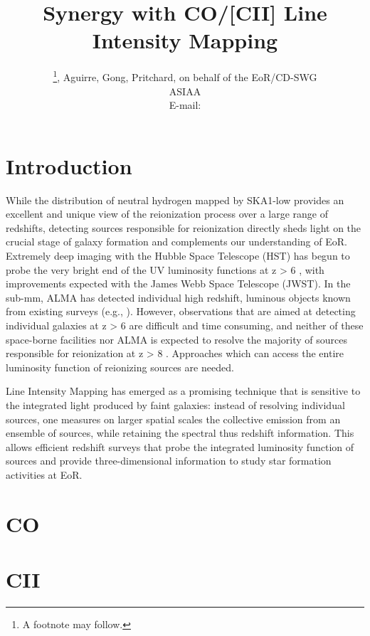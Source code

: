 \documentclass{PoS}
\title{Synergy with CO/[CII] Line Intensity Mapping}
\author{\speaker{Chang}\thanks{A footnote may follow.}, Aguirre, Gong,
  Pritchard,  on behalf of the EoR/CD-SWG\\
        ASIAA\\
        E-mail: \email{tcchang@asiaa.sinica.edu.tw}}
\begin{document}
\section{Introduction}

While the distribution of neutral
hydrogen mapped by SKA1-low provides an excellent and unique view of the reionization
process over a large range of redshifts, detecting sources responsible for
reionization directly sheds light on the crucial stage of galaxy
formation and complements our understanding of EoR.   Extremely deep
imaging with the Hubble Space Telescope (HST) has begun to probe the very bright end of the UV
luminosity functions at z > 6 \cite{2014arXiv1403.4295B, 2013ApJ...768...71R}, with improvements expected 
with the  James Webb Space Telescope (JWST). In the sub-mm, ALMA has
detected individual high redshift, luminous objects known from
existing surveys (e.g., \cite{2013ApJ...778..102O}). However, observations that are aimed at
detecting individual galaxies at z > 6 are difficult and time
consuming, and neither of these space-borne facilities nor ALMA is
expected to resolve the majority of sources responsible for
reionization at z > 8 \cite{2011MNRAS.414..847S}.  Approaches which can access the entire
luminosity function of reionizing sources are needed.

Line Intensity Mapping has emerged as a promising technique that is sensitive
to the integrated light produced by faint galaxies: instead of
resolving individual sources, one measures on larger spatial scales the collective emission
from an ensemble of sources, while retaining the spectral thus redshift
information.  This allows efficient redshift surveys that probe the
integrated luminosity function of sources and provide three-dimensional
information to study star formation activities at EoR. 


\section{CO}


\section{CII}

\end{document}
